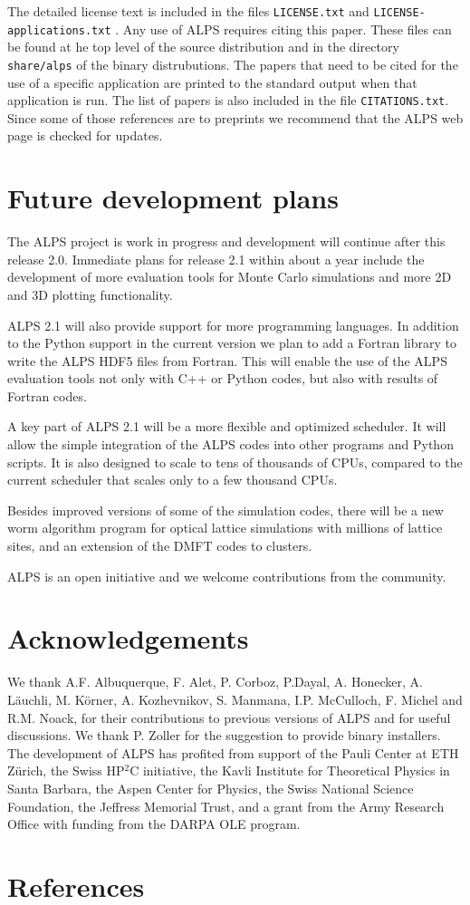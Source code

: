 \documentclass[12pt]{iopart}
\begin{document}
The detailed license text is included in the files {\tt LICENSE.txt} \cite{librarylicense} and {\tt LICENSE-applications.txt}  \cite{applicationlicense}. Any use of ALPS requires citing this paper.  These files can be found at he top level of the source distribution and in the directory {\tt share/alps} of the binary distrubutions. The papers that need to be cited for the use of a specific application are printed to the standard output when that application is run. The list of papers is also included in the file {\tt CITATIONS.txt}. Since some of those references are to preprints we recommend that the ALPS web page \cite{alps} is checked for updates.

\section{Future development plans}

The ALPS project is work in progress and development will continue after this release 2.0. Immediate plans for release 2.1 within about a year include the development of  more evaluation tools for Monte Carlo simulations and more 2D and 3D plotting functionality.

ALPS 2.1 will also provide support for more programming languages. In addition to the Python support in the current version we plan to add a Fortran library to write the ALPS HDF5 files from Fortran. This will enable the use of the ALPS evaluation tools not only with C++ or Python codes, but also with results of Fortran codes.

A key part of ALPS 2.1 will be a more flexible and optimized scheduler. It will allow  the simple integration of the ALPS codes into other programs and Python scripts. It is also designed to scale to tens of thousands of CPUs, compared to the current scheduler that scales only to a few thousand CPUs. 

Besides improved versions of some of the simulation codes, there will be a new worm algorithm program for optical lattice simulations with millions of lattice sites, and an extension of the DMFT codes to clusters.

ALPS is an open initiative and we welcome contributions from the community.


\section{Acknowledgements}

We thank A.F. Albuquerque, F. Alet, P. Corboz, P.Dayal, A. Honecker, A. L\"auchli, M. K\"orner,  A. Kozhevnikov, S. Manmana, I.P. McCulloch, F. Michel and R.M. Noack, for their contributions to previous versions of ALPS and  for useful discussions. We thank P. Zoller for the suggestion to provide binary installers. The development of ALPS has profited from support of the Pauli Center at ETH Z\"urich, the Swiss HP$^2$C initiative, the Kavli Institute for Theoretical Physics in Santa Barbara, the Aspen Center for Physics, the Swiss National Science Foundation, the Jeffress Memorial Trust, and a grant from the Army Research Office with funding from the DARPA OLE program.


\section*{References}



\end{document}
